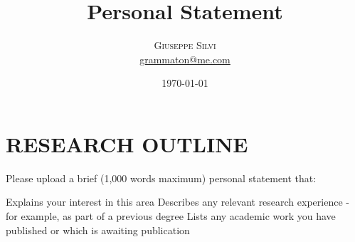 \documentclass[
	a4paper,
	twocolumn
	]{article}
\title{Personal Statement} %
\author{%
\textsc{Giuseppe Silvi}\\[1ex]%
\normalsize \href{mailto:me@giuseppesilvi.com}{grammaton@me.com} %
}
\date{\today} %
\begin{document}
\maketitle
\thispagestyle{empty}
\section*{RESEARCH OUTLINE}
Please upload a brief (1,000 words maximum) personal statement that:

Explains your interest in this area
Describes any relevant research experience - for example, as part of a previous degree
Lists any academic work you have published or which is awaiting publication
\end{document}
